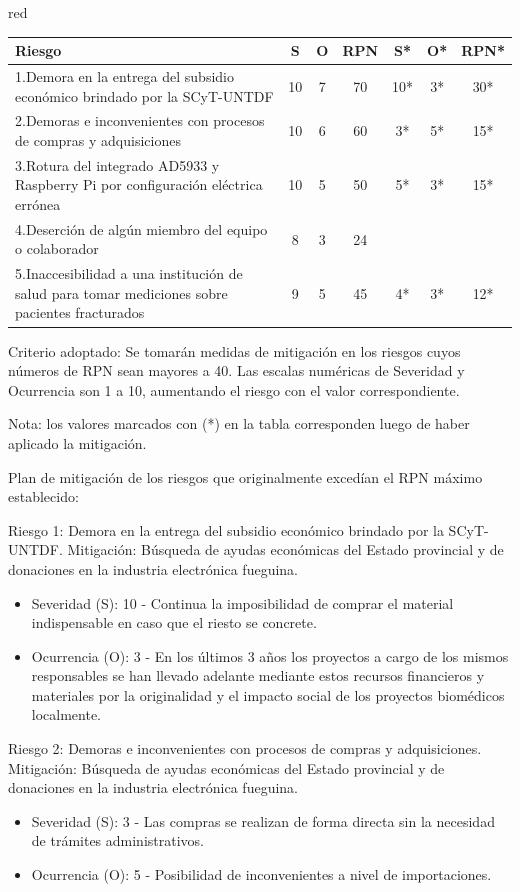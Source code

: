 \documentclass[11pt]{charter}
\begin{document}
\begin{consigna}{red}
\begin{table}[H]
\centering
\begin{tabularx}{\linewidth}{@{}|X|c|c|c|c|c|c|@{}}
\hline
\rowcolor[HTML]{C0C0C0} 
Riesgo & S & O & RPN & S* & O* & RPN* \\ \hline
1.Demora en la entrega del subsidio económico brindado por la SCyT-UNTDF & 10 & 7 & 70 & 10* & 3* & 30* \\ \hline
2.Demoras e inconvenientes con procesos de compras y adquisiciones & 10 & 6 & 60 & 3* & 5* & 15* \\ \hline
3.Rotura del integrado AD5933  y Raspberry Pi por configuración eléctrica errónea & 10 & 5 & 50 & 5* & 3* & 15* \\ \hline
4.Deserción de algún miembro del equipo o colaborador & 8 & 3 & 24 &    &    &      \\ \hline
5.Inaccesibilidad a una institución de salud para tomar mediciones sobre pacientes fracturados & 9 & 5 & 45 & 4* & 3* & 12* \\ \hline
\end{tabularx}%
\end{table}

Criterio adoptado: 
Se tomarán medidas de mitigación en los riesgos cuyos números de RPN sean mayores a 40. Las escalas numéricas de Severidad y Ocurrencia son 1 a 10, aumentando el riesgo con el valor correspondiente.

Nota: los valores marcados con (*) en la tabla corresponden luego de haber aplicado la mitigación.

Plan de mitigación de los riesgos que originalmente excedían el RPN máximo establecido:
 
Riesgo 1: Demora en la entrega del subsidio económico brindado por la SCyT-UNTDF.
Mitigación: Búsqueda de ayudas económicas del Estado provincial y de donaciones en la industria electrónica fueguina.
\begin{itemize}
\item Severidad (S): 10 - Continua la imposibilidad de comprar el material indispensable en caso que el riesto se concrete.
\item Ocurrencia (O): 3 - En los últimos 3 años los proyectos a cargo de los mismos responsables se han llevado adelante mediante estos recursos financieros y materiales por la originalidad y el impacto social de los proyectos biomédicos localmente.
\end{itemize}

Riesgo 2: Demoras e inconvenientes con procesos de compras y adquisiciones.
Mitigación: Búsqueda de ayudas económicas del Estado provincial y de donaciones en la industria electrónica fueguina.
\begin{itemize}
\item Severidad (S): 3 - Las compras se realizan de forma directa sin la necesidad de trámites administrativos.
\item Ocurrencia (O): 5 - Posibilidad de inconvenientes a nivel de importaciones.
\end{itemize}


\end{consigna}
\end{document}
